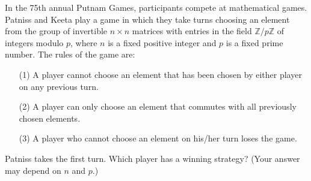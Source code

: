 In the 75th annual Putnam Games, participants compete at mathematical games.
Patniss and Keeta play a game in which they take turns choosing an element 
from the group of invertible $n \times n$ matrices with entries in the field
$\mathbb{Z}/p \mathbb{Z}$ of integers modulo $p$, where $n$ is a fixed positive integer and $p$ is a fixed prime number. The rules of the game are:
\begin{enumerate}
\item[(1)]
A player cannot choose an element that has been chosen by either player on any previous turn.
\item[(2)]
A player can only choose an element that commutes with all previously chosen elements.
\item[(3)]
A player who cannot choose an element on his/her turn loses the game.
\end{enumerate}
Patniss takes the first turn. Which player has a winning strategy?
(Your answer may depend on $n$ and $p$.)
